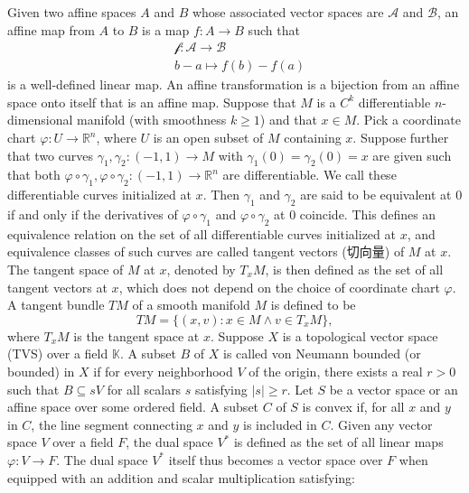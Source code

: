 \documentclass[a4paper,12pt]{article}
\begin{document}
Given two affine spaces $A$ and $B$ whose associated vector spaces are $\mathscr{A}$ and $\mathscr{B}$, an affine map from $A$ to $B$ is a map $f\colon A\to B$ such that
\[\begin{aligned}
&\mathscr{f}\colon\mathscr{A}\to\mathscr{B}\\
&b-a\mapsto f(b)-f(a)
\end{aligned}\]
is a well-defined linear map.
An affine transformation is a bijection from an affine space onto itself that is an affine map.
Suppose that $M$ is a $C^k$ differentiable $n$-dimensional manifold (with smoothness $k\geq 1$) and that $x\in M$. Pick a coordinate chart $\varphi\colon U\to\mathbb{R}^n$, where $U$ is an open subset of $M$ containing $x$. Suppose further that two curves $\gamma_1,\gamma_2\colon (-1,1)\to M$ with $\gamma_1(0)=\gamma_2(0)=x$ are given such that both $\varphi\circ\gamma_1,\varphi\circ\gamma_2\colon (-1,1)\to\mathbb{R}^n$ are differentiable. We call these differentiable curves initialized at $x$. Then $\gamma_1$ and $\gamma_2$ are said to be equivalent at $0$ if and only if the derivatives of $\varphi\circ\gamma_1$ and $\varphi\circ\gamma_2$ at $0$ coincide. This defines an equivalence relation on the set of all differentiable curves initialized at $x$, and equivalence classes of such curves are called tangent vectors (切向量) of $M$ at $x$. The tangent space of $M$ at $x$, denoted by $T_xM$, is then defined as the set of all tangent vectors at $x$, which does not depend on the choice of coordinate chart $\varphi$.
A tangent bundle $TM$ of a smooth manifold $M$ is defined to be
\[TM=\{(x,v)\colon x\in M\land v\in T_xM\},\]
where $T_xM$ is the tangent space at $x$.
Suppose $X$ is a topological vector space (TVS) over a field $\mathbb{K}$. A subset $B$ of $X$ is called von Neumann bounded (or bounded) in $X$ if for every neighborhood $V$ of the origin, there exists a real $r>0$ such that $B\subseteq sV$ for all scalars $s$ satisfying $|s|\geq r$.
Let $S$ be a vector space or an affine space over some ordered field. A subset $C$ of $S$ is convex if, for all $x$ and $y$ in $C$, the line segment connecting $x$ and $y$ is included in $C$.
Given any vector space $V$ over a field $F$, the dual space $V^*$ is defined as the set of all linear maps $\varphi\colon V\to F$. The dual space $V^*$ itself thus becomes a vector space over $F$ when equipped with an addition and scalar multiplication satisfying:
\end{document}
